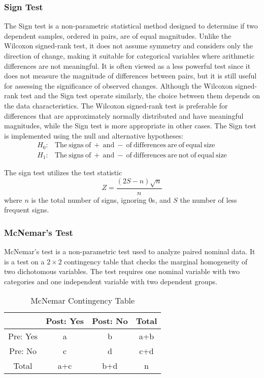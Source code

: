 \subsubsection{Sign Test}
\hfill \break
The Sign test is a non-parametric statistical method designed to determine if two dependent samples, ordered in pairs, are of equal magnitudes. Unlike the Wilcoxon signed-rank test, it does not assume symmetry and considers only the direction of change, making it suitable for categorical variables where arithmetic differences are not meaningful. It is often viewed as a less powerful test since it does not measure the magnitude of differences between pairs, but it is still useful for assessing the significance of observed changes. Although the Wilcoxon signed-rank test and the Sign test operate similarly, the choice between them depends on the data characteristics. The Wilcoxon signed-rank test is preferable for differences that are approximately normally distributed and have meaningful magnitudes, while the Sign test is more appropriate in other cases. The Sign test is implemented using the null and alternative hypotheses:
\begin{equation}
\begin{array}{rl}
	H_0 : & \mathrm{The\ signs\ of\ +\ and\ -\ of\ differences\ are\ of\ equal\ size} \\
	H_1 : & \mathrm{The\ signs\ of\ +\ and\ -\ of\ differences\ are\ not\ of\ equal\ size}
\end{array}
\end{equation}

The sign test utilizes the test statistic
\begin{equation}
	Z = \frac{(2S - n)\sqrt{n}}{n}
\end{equation}
where $n$ is the total number of signs, ignoring 0s, and $S$ the number of less frequent signs.

\subsubsection{McNemar's Test}
\hfill \break
McNemar's test is a non-parametric test used to analyze paired nominal data. It is a test on a $2\times 2$ contingency table that checks the marginal homogeneity of two dichotomous variables. The test requires one nominal variable with two categories and one independent variable with two dependent groups.

\begin{table}[ht]
\centering
\begin{tabular}{ |c|c|c|c| } 
	\hline
	 & Post: Yes & Post: No & Total \\
	\hline
	Pre: Yes & a & b & a+b \\ 
	Pre: No & c & d & c+d \\
	Total & a+c & b+d & n \\
	\hline
\end{tabular}
\caption{McNemar Contingency Table}
\label{tab:mcnemar}
\end{table}

